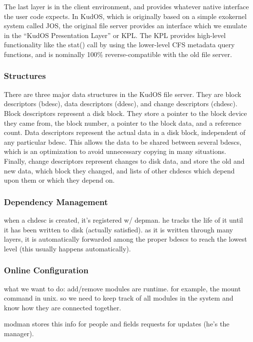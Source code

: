 The last layer is in the client environment, and provides whatever native
interface the user code expects. In KudOS, which is originally based on a simple
exokernel system called JOS, the original file server provides an interface
which we emulate in the ``KudOS Presentation Layer'' or KPL. The KPL provides
high-level functionality like the stat() call by using the lower-level CFS
metadata query functions, and is nominally 100\% reverse-compatible with the old
file server.

\subsubsection{Structures}

There are three major data structures in the KudOS file server. They are block
descriptors (bdesc), data descriptors (ddesc), and change descriptors (chdesc).
Block descriptors represent a disk block. They store a pointer to the block
device they came from, the block number, a pointer to the block data, and a
reference count. Data descriptors represent the actual data in a disk block,
independent of any particular bdesc. This allows the data to be shared between
several bdescs, which is an optimization to avoid unnecessary copying in many
situations. Finally, change descriptors represent changes to disk data, and
store the old and new data, which block they changed, and lists of other chdescs
which depend upon them or which they depend on.

\subsubsection{Dependency Management}

when a chdesc is created, it's registered w/ depman. he tracks the
life of it until it has been written to disk (actually satisfied). as
it is written through many layers, it is automatically forwarded
among the proper bdescs to reach the lowest level (this usually
happens automatically).

\subsubsection{Online Configuration}

what we want to do: add/remove modules are runtime. for example, the
mount command in unix. so we need to keep track of all modules in the
system and know how they are connected together.

modman stores this info for people and fields requests for updates
(he's the manager).

